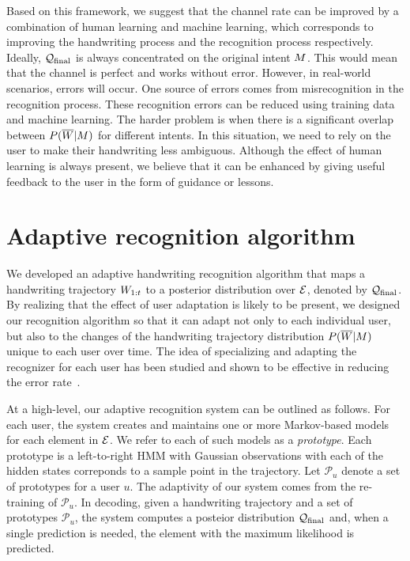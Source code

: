 \documentclass{sigchi}
\begin{document}
Based on this framework, we suggest that the channel rate can be improved
by a combination of human learning and machine learning, which
corresponds to improving the handwriting process and the recognition
process respectively. Ideally, $\mathcal{Q}_{\mathrm{final}}$ is always concentrated
on the original intent $M$. This would mean that the channel is
perfect and works without error. However, in real-world scenarios,
errors will occur. One source of errors comes from misrecognition in
the recognition process. These recognition errors can be reduced using
training data and machine learning. The harder problem is when there
is a significant overlap between $P(\overline{W} | M)$ for different
intents. In this situation, we need to rely on the user to make
their handwriting less ambiguous. Although the effect of human
learning is always present, we believe that it can be enhanced by
giving useful feedback to the user in the form of guidance or lessons.


\section{Adaptive recognition algorithm}
\label{sec:recognition_algorithm}

\newcommand{\prototypeSet}{\mathcal{P}}

We developed an adaptive handwriting recognition algorithm that maps a
handwriting trajectory $W_{1:{t}}$ to a posterior distribution over
$\mathcal{E}$, denoted by $\mathcal{Q}_{\mathrm{final}}$. By realizing that the effect of
user adaptation is likely to be present, we designed our recognition
algorithm so that it can adapt not only to each individual user, but
also to the changes of the handwriting trajectory distribution
$P(\overline{W} | M)$ unique to each user over time. The idea of specializing
and adapting the recognizer for each user has been studied and shown
to be effective in reducing the error rate~\cite{Connell2002, Matic93,
  Kienzle06}.

At a high-level, our adaptive recognition system can be outlined as
follows. For each user, the system creates and maintains one or more
Markov-based models~\cite{ThomasPloetz2011} for each element in
$\mathcal{E}$. We refer to each of such models as a {\em
  prototype}. Each prototype is a left-to-right HMM with Gaussian
observations with each of the hidden states correponds to a sample
point in the trajectory. Let $\prototypeSet_u$ denote a set of
prototypes for a user $u$. The adaptivity of our system comes from the
re-training of $\prototypeSet_u$. In decoding, given a handwriting
trajectory and a set of prototypes $\prototypeSet_u$, the system
computes a posteior distribution $\mathcal{Q}_{\mathrm{final}}$ and, when a single
prediction is needed, the element with the maximum likelihood is
predicted.
\end{document}
